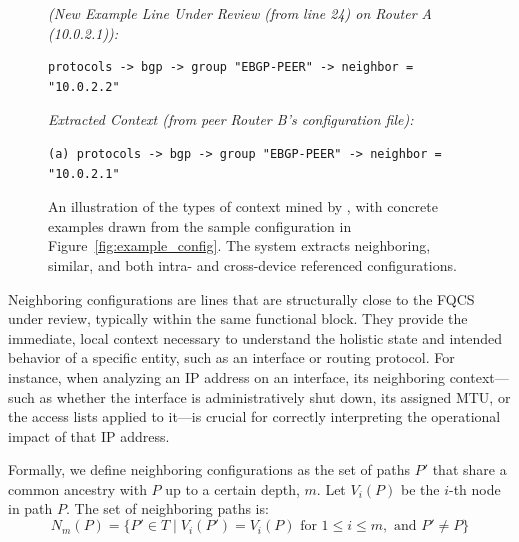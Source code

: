 \begin{figure}[t]
\begin{mdframed}
\begin{minipage}{0.95\textwidth}
    \textit{(New Example Line Under Review (from line 24) on Router A (10.0.2.1)):}
    \begin{Verbatim}
protocols -> bgp -> group "EBGP-PEER" -> neighbor = "10.0.2.2"
    \end{Verbatim}
    \textit{Extracted Context (from peer Router B's configuration file):}
    \begin{Verbatim}
(a) protocols -> bgp -> group "EBGP-PEER" -> neighbor = "10.0.2.1"
    \end{Verbatim}
    
    \end{minipage}
    \end{mdframed}

    \caption{An illustration of the types of context mined by \sysname{}, with concrete examples drawn from the sample configuration in Figure~\ref{fig:example_config}. The system extracts neighboring, similar, and both intra- and cross-device referenced configurations.}
    \label{fig:context_mine}
\end{figure}

Neighboring configurations are lines that are structurally close to the FQCS under review, typically within the same functional block. They provide the immediate, local context necessary to understand the holistic state and intended behavior of a specific entity, such as an interface or routing protocol. For instance, when analyzing an IP address on an interface, its neighboring context—such as whether the interface is administratively shut down, its assigned MTU, or the access lists applied to it—is crucial for correctly interpreting the operational impact of that IP address.


Formally, we define neighboring configurations as the set of paths $P'$ that share a common ancestry with $P$ up to a certain depth, $m$. Let $V_i(P)$ be the $i$-th node in path $P$. The set of neighboring paths is:
\[
N_m(P) = \{ P' \in T \mid V_i(P') = V_i(P) \text{ for } 1 \le i \le m, \text{ and } P' \neq P \}
\]

